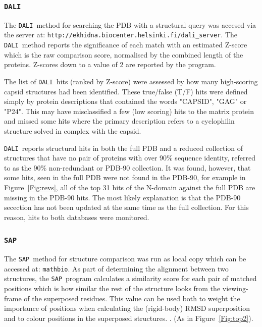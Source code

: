 \documentclass[preprint,12pt]{elsarticle}
\newcommand{\SAP}{{\tt SAP}}
\newcommand{\DALI}{{\tt DALI}}
\newcommand{\Fig}[1]{Figure~\ref{Fig:#1}}
\begin{document}
\subsubsection{\DALI}

The \DALI\ method for searching the PDB with a structural query \cite{HolmLet93a}
was accesed via the server at:
{\tt http://ekhidna.biocenter.helsinki.fi/dali\_server}.
The \DALI\ method reports the significance of each match with an estimated Z-score
which is the raw comparison score, normalised by the combined length of the proteins.
Z-scores down to a value of 2 are reported by the program.

The list of \DALI\ hits (ranked by Z-score) were assessed by how many high-scoring capsid structures had
been identified.    These true/false (T/F) hits were defined simply by protein descriptions that contained the
words "CAPSID", "GAG" or "P24".   This may have misclassified a few (low scoring) hits to the matrix protein
and missed some hits where the primary description refers to a cyclophilin structure solved in complex
with the capsid.

\DALI\ reports structural hits in both the full PDB and a reduced collection of structures that
have no pair of proteins with over 90\% sequence identity, referred to as the 90\% non-redundant or PDB-90 collection.
It was found, however, that some hits, seen in the full PDB were not found in the PDB-90, for example in \Fig{revs},
all of the top 31 hits of the N-domain against the full PDB are missing in the PDB-90 hits.
The most likely explanation is that the PDB-90 secection has not been updated at the same time
as the full collection.    For this reason, hits to both databases were monitored.

\subsubsection{\SAP}

The \SAP\ method for structure comparison \cite{TaylorWR99a} was run as local copy which can
be accessed at: {\tt mathbio}.   As part of determining the alignment between two structures,
the \SAP\ program calculates a similarity score for each pair of matched positions which is
how similar the rest of the structure looks from the viewing-frame of the superposed residues.
This value can be used both to weight the importance of positions when calculating the
(rigid-body) RMSD superposition and to colour positions in the superposed structures.
\cite{RippmannFet91a}. (As in \Fig{top2}).
\end{document}
